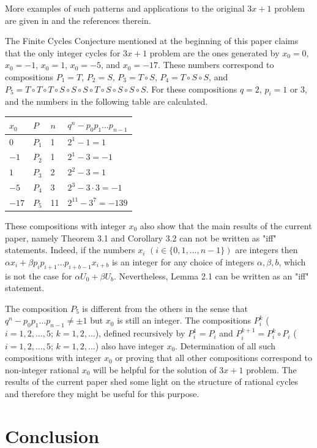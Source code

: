 \documentclass[12pt, twoside, leqno]{article}
\theoremstyle{definition}
\numberwithin{equation}{section}
\begin{document}
More examples of such patterns and applications to the original $3x+1$ problem are given in \cite{aliyev} and the references therein.

The Finite Cycles Conjecture mentioned at the beginning of this paper claims that the only integer cycles for $3x+1$ problem are the ones generated by $x_0=0$, $x_0=-1$, $x_0=1$, $x_0=-5$, and $x_0=-17$. These numbers correspond to compositions $P_1=T$, $P_2=S$, $P_3=T\circ S$, $P_4=T\circ S\circ S$, and $P_5=T\circ T\circ T\circ S\circ S\circ S\circ T\circ S\circ S\circ S\circ S$. For these compositions $q=2$, $p_i=1$ or $3$, and the numbers in the following table are calculated.
\begin{center}
\begin{tabular}{|l|l|l|l|}
\hline
$x_0$ & $P$   &$n$ & $q^n-p_0p_1\ldots p_{n-1}$  \\
\hline
$0$ & $P_1$ &1 & $2^1-1=1$   \\
$-1$ & $P_2$ &1 & $2^1-3=-1$   \\
$1$ & $P_3$ &2 &$2^2-3=1$ \\
$-5$ & $P_4$ &3 & $2^3-3\cdot 3=-1$ \\
$-17$ & $P_5$ &11 & $2^{11}-3^7=-139$  \\
\hline
\end{tabular}
\end{center}

These compositions with integer $x_0$ also show that the main results of the current paper, namely Theorem 3.1 and Corollary 3.2 can not be written as "iff" statements. Indeed, if the numbers $x_i$ $(i\in \{0, 1,\ldots , n-1\})$ are integers then $\alpha x_i+\beta p_i p_{i+1}\ldots p_{i+b-1} x_{i+b}$ is an integer for any choice of integers $\alpha ,\beta , b$, which is not the case for $\alpha U_0+\beta U_b$. Nevertheless, Lemma 2.1 can be written as an "iff" statement.

The composition $P_5$ is different from the others in the sense that $q^n-p_0p_1\ldots p_{n-1}\ne \pm 1$ but $x_0$ is still an integer. The compositions $P_i^k$ ($i=1,2,\ldots ,5$; $k=1,2,\ldots$), defined recursively by $P_i^1=P_i$ and $P_i^{k+1}=P_i^k\circ P_i$ ($i=1,2,\ldots ,5$; $k=1,2,\ldots$) also have integer $x_0$. Determination of all such compositions with integer $x_0$ or proving that all other compositions correspond to non-integer rational $x_0$ will be helpful for the solution of $3x+1$ problem. The results of the current paper shed some light on the structure of rational cycles and therefore they might be useful for this purpose.
\section{Conclusion}
\end{document}
